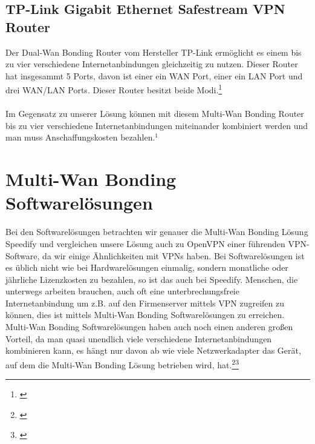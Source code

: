 \newpage
\subsection{TP-Link Gigabit Ethernet Safestream VPN Router}
Der Dual-Wan Bonding Router vom Hersteller TP-Link ermöglicht es einem bis zu vier verschiedene Internetanbindungen gleichzeitig zu nutzen. Dieser Router hat insgesammt 5 Ports, davon ist einer ein WAN Port, einer ein LAN Port und drei WAN/LAN Ports. Dieser Router besitzt beide Modi.\footnote[1]{\cite[Vgl.][]{5}}
\\\\
Im Gegensatz zu unserer Lösung können mit diesem Multi-Wan Bonding Router bis zu vier verschiedene Internetanbindungen miteinander kombiniert werden und man muss Anschaffungskosten bezahlen.$^{1}$


\section{Multi-Wan Bonding Softwarelösungen}
Bei den Softwarelösungen betrachten wir genauer die Multi-Wan Bonding Lösung Speedify und vergleichen unsere Lösung auch zu OpenVPN einer führenden VPN-Software, da wir einige Ähnlichkeiten mit VPNs haben. Bei Softwarelösungen ist es üblich nicht wie bei Hardwarelösungen einmalig, sondern monatliche oder jährliche Lizenzkosten zu bezahlen, so ist das auch bei Speedify. Menschen, die unterwegs arbeiten brauchen, auch oft eine unterbrechungsfreie Internetanbindung um z.B. auf den Firmenserver mittels VPN zugreifen zu können, dies ist mittels Multi-Wan Bonding Softwarelösungen zu erreichen. Multi-Wan Bonding Softwarelösungen haben auch noch einen anderen großen Vorteil, da man quasi unendlich viele verschiedene Internetanbindungen kombinieren kann, es hängt nur davon ab wie viele Netzwerkadapter das Gerät, auf dem die Multi-Wan Bonding Lösung betrieben wird, hat.\footnote[2]{\cite[Vgl.][]{3}}\footnote[3]{\cite[Vgl.][]{4}}


